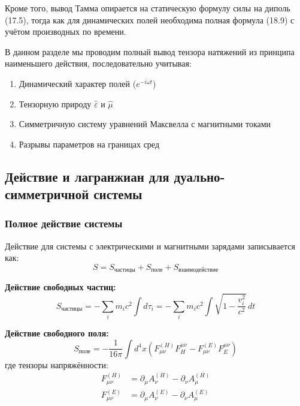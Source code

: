 \documentclass[a4paper,12pt]{article}
\begin{document}
Кроме того, вывод Тамма опирается на статическую формулу силы на диполь (17.5), тогда как для динамических полей необходима полная формула (18.9) с учётом производных по времени.

В данном разделе мы проводим полный вывод тензора натяжений из принципа наименьшего действия, последовательно учитывая:
\begin{enumerate}
    \item Динамический характер полей ($e^{-i\omega t}$)
    \item Тензорную природу $\hat{\varepsilon}$ и $\hat{\mu}$
    \item Симметричную систему уравнений Максвелла с магнитными токами
    \item Разрывы параметров на границах сред
\end{enumerate}

\subsection{Действие и лагранжиан для дуально-симметричной системы}

\subsubsection{Полное действие системы}

Действие для системы с электрическими и магнитными зарядами записывается как:
\begin{equation}
S = S_{\text{частицы}} + S_{\text{поле}} + S_{\text{взаимодействие}}
\label{eq:total_action}
\end{equation}

\textbf{Действие свободных частиц:}
\begin{equation}
S_{\text{частицы}} = -\sum_i m_i c^2 \int d\tau_i = -\sum_i m_i c^2 \int \sqrt{1 - \frac{v_i^2}{c^2}} \, dt
\label{eq:action_particles}
\end{equation}

\textbf{Действие свободного поля:}
\begin{equation}
S_{\text{поле}} = -\frac{1}{16\pi} \int d^4x \left( F^{(H)}_{\mu\nu} F_H^{\mu\nu} - F^{(E)}_{\mu\nu} F_E^{\mu\nu} \right)
\label{eq:action_field}
\end{equation}
где тензоры напряжённости:
\begin{align}
F^{(H)}_{\mu\nu} &= \partial_\mu A^{(H)}_\nu - \partial_\nu A^{(H)}_\mu \\
F^{(E)}_{\mu\nu} &= \partial_\mu A^{(E)}_\nu - \partial_\nu A^{(E)}_\mu
\end{align}
\end{document}
